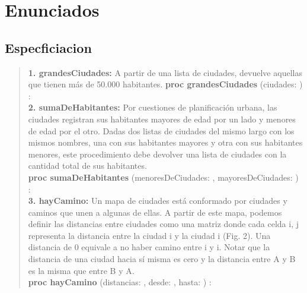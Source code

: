 \documentclass[10pt,a4paper]{article}
\begin{document}
\maketitle
\section {Enunciados}
\subsection{Especficiacion}

\begin{quote}
	\vspace{0.2cm}
	\textbf{1. grandesCiudades:} A partir de una lista de ciudades, devuelve aquellas que tienen más de 50.000 habitantes.  
	\textbf{proc grandesCiudades} (\In ciudades: ) : 
	\vspace{0.2cm}
	\\
	\vspace{0.2cm}
	\textbf{2. sumaDeHabitantes:} Por cuestiones de planificación urbana, las ciudades registran sus habitantes mayores de edad por un lado y menores de edad por el otro. Dadas dos listas de ciudades del mismo largo con los mismos nombres, una con sus habitantes mayores y otra con sus habitantes menores, este procedimiento debe devolver una lista de ciudades con la cantidad total de sus habitantes.
	\\
	\vspace{0.2cm}
	\textbf{proc sumaDeHabitantes} (\In menoresDeCiudades: , \In mayoresDeCiudades: ) : 
	\\
	\vspace{0.2cm}
	\textbf{3. hayCamino:} Un mapa de ciudades está conformado por ciudades y caminos que unen a algunas de ellas. A partir de este mapa, podemos definir las distancias entre ciudades como una matriz donde cada celda i, j representa la distancia entre la ciudad i y la ciudad i (Fig. 2). Una distancia de 0 equivale a no haber camino entre i y i. Notar que la distancia de una ciudad hacia sí misma es cero y la distancia entre A y B es la misma que entre B y A.
	\vspace{0.2cm}
	\\
	\vspace{0.2cm}
	\textbf{proc hayCamino} (\In distancias: \matriz{\ent}, \In desde: \ent, \In hasta: \ent) : \bool
	\vspace{0.2cm}
	\\
	\vspace{0.2cm}

\end{quote}
\end{document}
